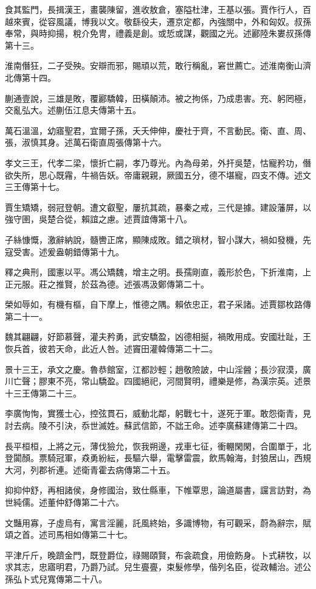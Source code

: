 \begin{pinyinscope}
食其監門，長揖漢王，畫襲陳留，進收敖倉，塞隘杜津，王基以張。賈作行人，百越來賓，從容風議，博我以文。敬繇役夫，遷京定都，內強關中，外和匈奴。叔孫奉常，與時抑揚，稅介免冑，禮義是創。或悊或謀，觀國之光。述酈陸朱婁叔孫傳第十三。

淮南僭狂，二子受殃。安辯而邪，賜頑以荒，敢行稱亂，窘世薦亡。述淮南衡山濟北傳第十四。

蒯通壹說，三雄是敗，覆酈驕韓，田橫顛沛。被之拘係，乃成患害。充、躬罔極，交亂弘大。述蒯伍江息夫傳第十五。

萬石溫溫，幼寤聖君，宜爾子孫，夭夭伸伸，慶社于齊，不言動民。衛、直、周、張，淑慎其身。述萬石衛直周張傳第十六。

孝文三王，代孝二梁，懷折亡嗣，孝乃尊光。內為母弟，外扞吳楚，怙寵矜功，僭欲失所，思心既霿，牛禍告妖。帝庸親親，厥國五分，德不堪寵，四支不傳。述文三王傳第十七。

賈生矯矯，弱冠登朝。遭文叡聖，屢抗其疏，暴秦之戒，三代是據。建設藩屏，以強守圉，吳楚合從，賴誼之慮。述賈誼傳第十八。

子絲慷慨，激辭納說，髓轡正席，顯陳成敗。錯之瑣材，智小謀大，禍如發機，先寇受害。述爰盎朝錯傳第十九。

釋之典刑，國憲以平。馮公矯魏，增主之明。長孺剛直，義形於色，下折淮南，上正元服。莊之推賢，於茲為德。述張馮汲鄭傳第二十。

榮如辱如，有機有樞，自下摩上，惟德之隅。賴依忠正，君子采諸。述賈鄒枚路傳第二十一。

魏其翩翩，好節慕聲，灌夫矜勇，武安驕盈，凶德相挻，禍敗用成。安國壯趾，王恢兵首，彼若天命，此近人咎。述竇田灌韓傳第二十二。

景十三王，承文之慶。魯恭館室，江都訬輕；趙敬險詖，中山淫醟；長沙寂漠，廣川亡聲；膠東不亮，常山驕盈。四國絕祀，河間賢明，禮樂是修，為漢宗英。述景十三王傳第二十三。

李廣恂恂，實獲士心，控弦貫石，威動北鄰，躬戰七十，遂死于軍。敢怨衛青，見討去病。陵不引決，忝世滅姓。蘇武信節，不詘王命。述李廣蘇建傳第二十四。

長平桓桓，上將之元，薄伐獫允，恢我朔邊，戎車七征，衝輣閑閑，合圍單于，北登闐顏。票騎冠軍，猋勇紛紜，長驅六舉，電擊雷震，飲馬翰海，封狼居山，西規大河，列郡祈連。述衛青霍去病傳第二十五。

抑抑仲舒，再相諸侯，身修國治，致仕縣車，下帷覃思，論道屬書，讜言訪對，為世純儒。述董仲舒傳第二十六。

文豔用寡，子虛烏有，寓言淫麗，託風終始，多識博物，有可觀采，蔚為辭宗，賦頌之首。述司馬相如傳第二十七。

平津斤斤，晚躋金門，既登爵位，祿賜頤賢，布衾疏食，用儉飭身。卜式耕牧，以求其志，忠寤明君，乃爵乃試。兒生亹亹，束髮修學，偕列名臣，從政輔治。述公孫弘卜式兒寬傳第二十八。


\end{pinyinscope}
